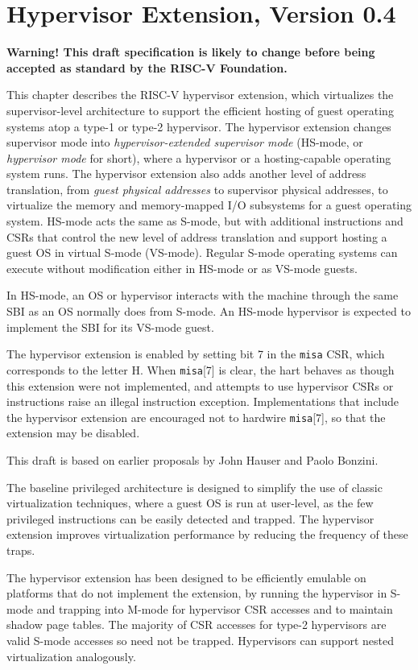 \chapter{Hypervisor Extension, Version 0.4}
\label{hypervisor}

{\bf Warning! This draft specification is likely to change before being
accepted as standard by the RISC-V Foundation.}

This chapter describes the RISC-V hypervisor extension, which virtualizes the
supervisor-level architecture to support the efficient hosting of guest
operating systems atop a type-1 or type-2 hypervisor.
The hypervisor extension changes supervisor mode into
{\em hypervisor-extended supervisor mode} (HS-mode, or {\em hypervisor
mode} for short), where a hypervisor or a hosting-capable operating system
runs.  The hypervisor extension also adds another level of address translation,
from {\em guest physical addresses} to supervisor physical addresses,
to virtualize the
memory and memory-mapped I/O subsystems for a guest operating system.  HS-mode
acts the same as S-mode, but with additional instructions and CSRs that control
the new level of address translation and support hosting a guest OS in virtual
S-mode (VS-mode).
Regular S-mode operating systems can execute without modification either in
HS-mode or as VS-mode guests.

In HS-mode, an OS or hypervisor interacts with the machine through the same
SBI as an OS normally does from S-mode.  An HS-mode hypervisor is expected to
implement the SBI for its VS-mode guest.

The hypervisor extension is enabled by setting bit 7 in the {\tt misa} CSR,
which corresponds to the letter H.  When {\tt misa}[7] is clear, the hart
behaves as though this extension were not implemented, and attempts to use
hypervisor CSRs or instructions raise an illegal instruction exception.
Implementations that include the hypervisor extension are encouraged
not to hardwire {\tt misa}[7], so that the extension may be disabled.

\begin{commentary}
This draft is based on earlier proposals by John Hauser and Paolo Bonzini.
\end{commentary}

\begin{commentary}
The baseline privileged architecture is designed to simplify the use of classic
virtualization techniques, where a guest OS is run at user-level, as
the few privileged instructions can be easily detected and trapped.
The hypervisor extension improves virtualization performance by
reducing the frequency of these traps.

The hypervisor extension has been designed to be efficiently
emulable on platforms that do not implement the extension, by running
the hypervisor in S-mode and trapping into M-mode for hypervisor CSR accesses
and to maintain shadow page tables.  The majority of CSR accesses for
type-2 hypervisors are valid S-mode accesses so need not be trapped.
Hypervisors can support nested virtualization analogously.
\end{commentary}


